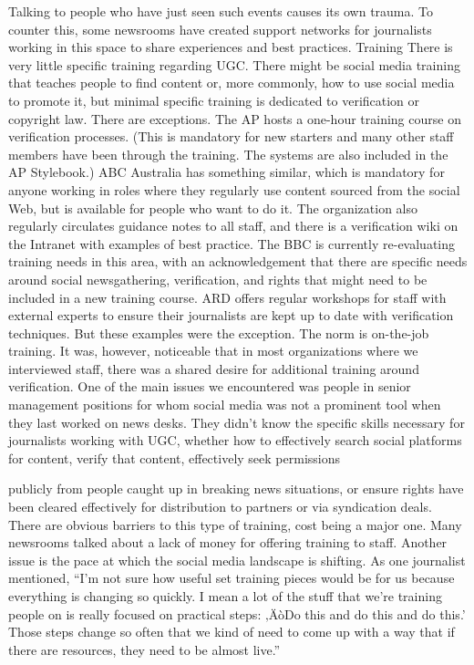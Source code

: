 \documentclass[symmetric, notoc, nobib]{towcenter-book}
\begin{document}
Talking to people who have just seen such events causes its own trauma. To
counter this, some newsrooms have created support networks for journalists
working in this space to share experiences and best practices.
Training
There is very little specific training regarding UGC. There might be social
media training that teaches people to find content or, more commonly,
how to use social media to promote it, but minimal specific training is
dedicated to verification or copyright law. There are exceptions. The AP
hosts a one-hour training course on verification processes. (This is mandatory
for new starters and many other staff members have been through the
training. The systems are also included in the AP Stylebook.) ABC Australia
has something similar, which is mandatory for anyone working in roles
where they regularly use content sourced from the social Web, but is available
for people who want to do it. The organization also regularly circulates
guidance notes to all staff, and there is a verification wiki on the Intranet
with examples of best practice. The BBC is currently re-evaluating training
needs in this area, with an acknowledgement that there are specific needs
around social newsgathering, verification, and rights that might need to be
included in a new training course. ARD offers regular workshops for staff
with external experts to ensure their journalists are kept up to date with
verification techniques.
But these examples were the exception. The norm is on-the-job training. It
was, however, noticeable that in most organizations where we interviewed
staff, there was a shared desire for additional training around verification.
One of the main issues we encountered was people in senior management
positions for whom social media was not a prominent tool when they last
worked on news desks. They didn't know the specific skills necessary for
journalists working with UGC, whether how to effectively search social
platforms for content, verify that content, effectively seek permissions

publicly from people caught up in breaking news situations, or ensure
rights have been cleared effectively for distribution to partners or via
syndication deals.
There are obvious barriers to this type of training, cost being a major one.
Many newsrooms talked about a lack of money for offering training to staff.
Another issue is the pace at which the social media landscape is shifting.
As one journalist mentioned, ``I'm not sure how useful set training pieces
would be for us because everything is changing so quickly. I mean a lot of
the stuff that we're training people on is really focused on practical steps:
‚ÄòDo this and do this and do this.' Those steps change so often that we kind
of need to come up with a way that if there are resources, they need to be
almost live.''
\end{document}
